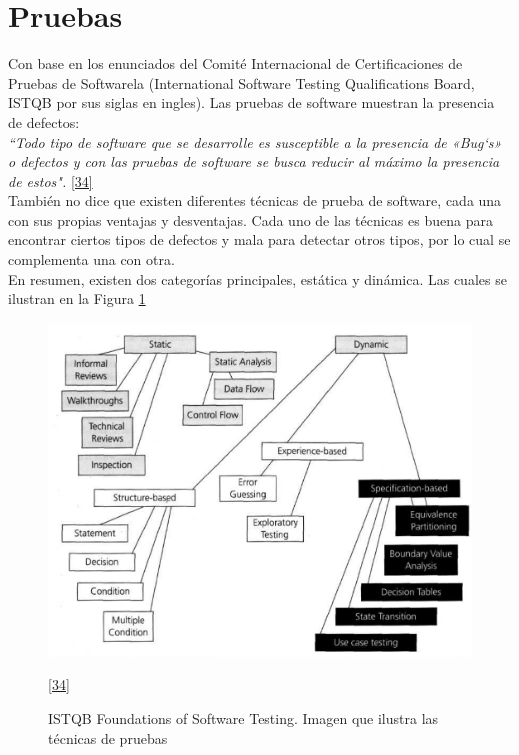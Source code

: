 \newpage

\section{Pruebas}

Con base en los enunciados del Comité Internacional de Certificaciones de Pruebas de Softwarela (International Software Testing Qualifications Board, ISTQB por sus siglas en ingles). Las pruebas de software muestran la presencia de defectos:\\

 \textit {``Todo tipo de software que se desarrolle es susceptible a la presencia de «Bug`s» o defectos y con las pruebas de software se busca reducir al máximo la presencia de estos".} \hyperlink{b34}{[34]} \\

También no dice que existen diferentes técnicas de prueba de software, cada una con sus propias ventajas y desventajas. Cada uno de las técnicas es buena para encontrar ciertos tipos  de defectos y mala para detectar otros tipos, por lo cual se complementa una con otra.\\

En resumen, existen dos categorías principales, estática y dinámica. Las cuales se ilustran en la Figura \ref{fig:tecnicas}
 
\begin{figure}[H]
	\begin{center}
		\includegraphics[width=.80\textwidth]{images/marcoteorico/tecnicas}
		\caption{ISTQB Foundations of Software Testing. Imagen que ilustra las técnicas de pruebas}
		\label{fig:tecnicas}
		\hyperlink{b34}{[34]}
	\end{center}
\end{figure}

